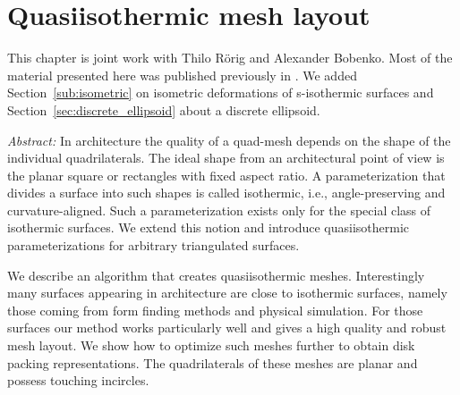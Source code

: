 \documentclass[Thesis.tex]{subfiles}
\begin{document}
\chapter{Quasiisothermic mesh layout}
\label{chp:quasiisothermic}

This chapter is joint work with Thilo R{\"o}rig and Alexander Bobenko.
Most of the material presented here was published previously in \cite{Sechelmann2012}. We added Section~\ref{sub:isometric} on isometric deformations of s-isothermic surfaces and Section~\ref{sec:discrete_ellipsoid} about a discrete ellipsoid.

\emph{Abstract:} 
In architecture the quality of a quad-mesh depends on the shape of the individual
quadrilaterals. The ideal shape from an architectural point of view is the
planar square or rectangles with fixed aspect ratio. A parameterization that divides a
surface into such shapes is called isothermic, i.e., angle-preserving and
curvature-aligned. Such a parameterization exists only for the special class of
isothermic surfaces. We extend this notion and introduce quasiisothermic
parameterizations for arbitrary triangulated  surfaces.

We describe an algorithm that creates quasiisothermic meshes.
Interestingly many surfaces appearing in architecture are close to
isothermic surfaces, namely those coming from form finding methods and physical
simulation. For those surfaces our method works particularly well and gives a
high quality and robust mesh layout. We show how to optimize such meshes
further to obtain disk packing representations. The quadrilaterals of these
meshes are planar and possess touching incircles.
\end{document}
